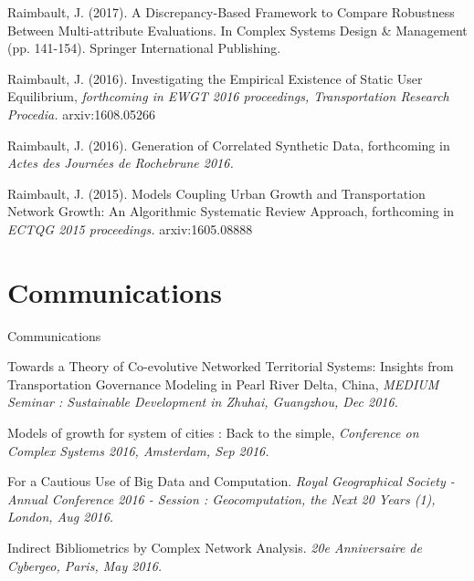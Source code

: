 \bigskip

\noindent Raimbault, J. (2017). A Discrepancy-Based Framework to Compare Robustness Between Multi-attribute Evaluations. In Complex Systems Design \& Management (pp. 141-154). Springer International Publishing. \cite{raimbault2016discrepancy}

\bigskip

\noindent Raimbault, J. (2016). Investigating the Empirical Existence of Static User Equilibrium, \textit{forthcoming in EWGT 2016 proceedings, Transportation Research Procedia.} arxiv:1608.05266 \cite{raimbault2016investigating}


\bigskip


\noindent Raimbault, J. (2016). Generation of Correlated Synthetic Data, forthcoming in \textit{Actes des Journ{\'e}es de Rochebrune 2016.}


\bigskip

\noindent Raimbault, J. (2015). Models Coupling Urban Growth and Transportation Network Growth: An Algorithmic Systematic Review Approach, forthcoming in \textit{ECTQG 2015 proceedings.} arxiv:1605.08888


\section*{Communications}{Communications}

\noindent Towards a Theory of Co-evolutive Networked Territorial Systems: Insights from Transportation Governance Modeling in Pearl River Delta, China, \textit{MEDIUM Seminar : Sustainable Development in Zhuhai, Guangzhou, Dec 2016.}


\bigskip


\noindent Models of growth for system of cities : Back to the simple, \textit{Conference on Complex Systems 2016, Amsterdam, Sep 2016.}





\bigskip

\noindent For a Cautious Use of Big Data and Computation. \textit{Royal Geographical Society - Annual Conference 2016 - Session : Geocomputation, the Next 20 Years (1), London, Aug 2016.}


\bigskip

\noindent Indirect Bibliometrics by Complex Network Analysis. \textit{20e Anniversaire de Cybergeo, Paris, May 2016.}


